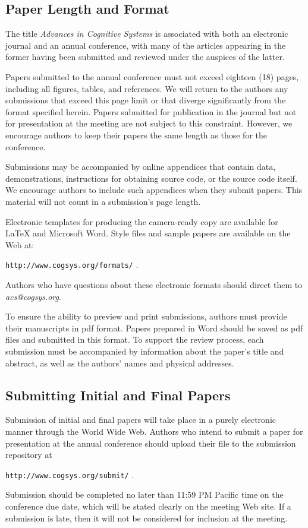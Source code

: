 \documentclass[11pt,letterpaper]{article}
\begin{document}
\subsection{Paper Length and Format}

The title {\it Advances in Cognitive Systems\/} is associated with
both an electronic journal and an annual conference, with many of the
articles appearing in the former having been submitted and reviewed
under the auspices of the latter. 

Papers submitted to the annual conference must not exceed eighteen (18)
pages, including all figures, tables, and references. We will return
to the authors any submissions that exceed this page limit or that
diverge significantly from the format specified herein.
Papers submitted for publication in the journal but not for presentation
at the meeting are not subject to this constraint. However, we encourage 
authors to keep their papers the same length as those for the conference.

Submissions may be accompanied by online appendices that contain data,
demonstrations, instructions for obtaining source code, or the source
code itself. We encourage authors to include such appendices when they
submit papers. This material will not count in a submission's page
length.

Electronic templates for producing the camera-ready copy are available
for \LaTeX\/ and Microsoft Word. Style files and sample papers are 
available on the Web at: 
\vskip 0.1in
\begin{small}
\centerline{{\tt http://www.cogsys.org/formats/} .}
\end{small}
\vskip 0.1in
\noindent
Authors who have questions about these electronic formats should direct
them to {\sl acs@cogsys.org}.

To ensure the ability to preview and print submissions, authors must
provide their manuscripts in pdf format. Papers prepared in Word
should be saved as pdf files and submitted in this format. To support
the review process, each submission must be accompanied by information
about the paper's title and abstract, as well as the authors' names
and physical addresses. 

\subsection{Submitting Initial and Final Papers}

Submission of initial and final papers will take place in a purely
electronic manner through the World Wide Web. Authors who intend to
submit a paper for presentation at the annual conference should upload
their file to the submission repository at
\vskip 0.1in
\begin{small}
\centerline{{\tt http://www.cogsys.org/submit/} .}
\end{small}
\vskip 0.12in
\noindent
Submission should be completed no later than 11:59 PM Pacific time 
on the conference due date, which will be stated clearly on the 
meeting Web site. If a submission is late, then it will not be 
considered for inclusion at the meeting.
\end{document}
